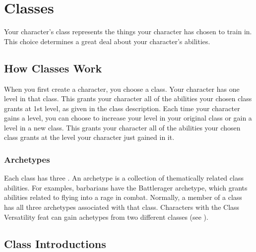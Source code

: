 \chapter{Classes}\label{Classes}

Your character's class represents the things your character has chosen to train in.
This choice determines a great deal about your character's abilities.

\section{How Classes Work}
    When you first create a character, you choose a class.
    Your character has one level in that class.
    This grants your character all of the abilities your chosen class grants at 1st level, as given in the class description.
    Each time your character gains a level, you can choose to increase your level in your original class or gain a level in a new class.
    This grants your character all of the abilities your chosen class grants at the level your character just gained in it.

    \subsection{Archetypes}
        Each class has three .
        An archetype is a collection of thematically related class abilities.
        For examples, barbarians have the Battlerager archetype, which grants abilities related to flying into a rage in combat.
        Normally, a member of a class has all three archetypes associated with that class.
        Characters with the Class Versatility feat can gain achetypes from two different classes (see ).

\section{Class Introductions}

